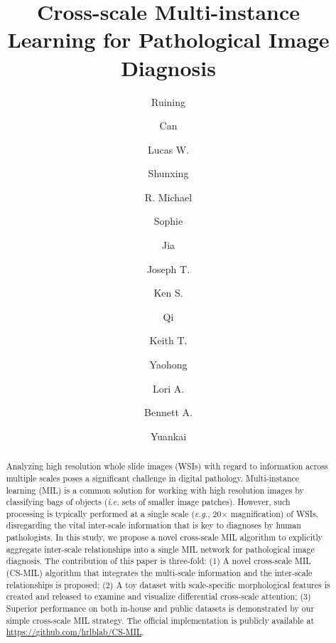 \documentclass[times,twocolumn,final]{elsarticle}
\begin{document}

\begin{frontmatter}

\title{Cross-scale Multi-instance Learning for Pathological Image Diagnosis}%

\author[1]{Ruining }
\author[1]{Can }
\author[1]{Lucas W. }
\author[1]{Shunxing }
\author[2]{R. Michael }
\author[3]{Sophie }
\author[3]{Jia }
\author[3]{Joseph T. }
\author[1]{Ken S. }
\author[3]{Qi }
\author[3,4]{Keith T. }
\author[3]{Yaohong }
\author[3,4]{Lori A. }
\author[1,3]{Bennett A. }
\author[1]{Yuankai }



\address[1]{Vanderbilt University, Nashville, TN 37215, USA}
\address[2]{The University of North Carolina at Chapel Hill, Chapel Hill, NC 27514, USA}
\address[3]{Vanderbilt University Medical Center, Nashville, TN 37232, USA}
\address[4]{Veterans Affairs Tennessee Valley Healthcare System, Nashville, TN 37212, USA}





\begin{abstract}
Analyzing high resolution whole slide images (WSIs) with regard to information across multiple scales poses a significant challenge in digital pathology. Multi-instance learning (MIL) is a common solution for working with high resolution images by classifying bags of objects (\textit{i.e.} sets of smaller image patches). However, such processing is typically performed at a single scale (\textit{e.g.}, 20$\times$ magnification) of WSIs, disregarding the vital inter-scale information that is key to diagnoses by human pathologists. In this study, we propose a novel cross-scale MIL algorithm to explicitly aggregate inter-scale relationships into a single MIL network for pathological image diagnosis. The contribution of this paper is three-fold: (1) A novel cross-scale MIL (CS-MIL) algorithm that integrates the multi-scale information and the inter-scale relationships is proposed; (2) A toy dataset with scale-specific morphological features is created and released to examine and visualize differential cross-scale attention; (3) Superior performance on both in-house and public datasets is demonstrated by our simple cross-scale MIL strategy. The official implementation is publicly available at \url{https://github.com/hrlblab/CS-MIL}.



\end{abstract}
\end{frontmatter}
\end{document}
